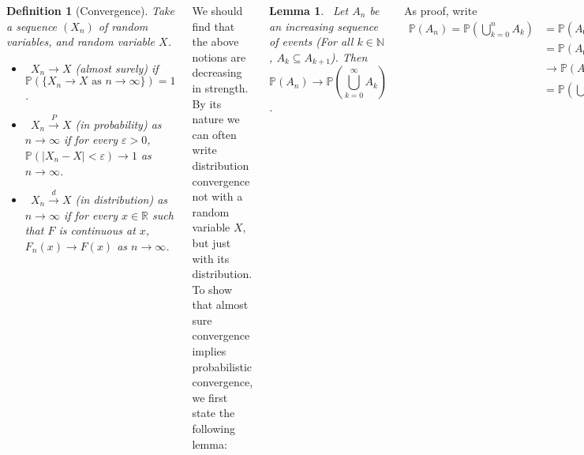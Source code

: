 \documentclass{tikzposter} %
\newtheorem{lemma}[theorem]{Lemma}
\newtheorem{definition}{Definition}
\begin{document}
\begin{columns}
{  \begin{definition}[Convergence]
    Take a sequence $(X_{n})$ of random variables, and random variable $X$.
    \begin{itemize}
            \item \ $X_{n} \to X$ (almost surely) if $\mathbb{P}(\{X_{n} \to X \text{ as } n \to \infty\}) = 1$.
            \item \ $X_{n} \overset{P}{\to} X$ (in probability) as $n \to \infty$ if for every $\varepsilon > 0$, $\mathbb{P}(|X_{n} - X| < \varepsilon) \to 1$ as $n \to \infty$.
            \item \ $X_{n} \overset{d}{\to} X$ (in distribution) as $n \to \infty$ if for every $x \in \mathbb{R}$ such that $F$ is continuous at $x$, $F_{n}(x) \to F(x)$ as $n \to \infty$.
    \end{itemize}
  \end{definition}
  \hphantom{}

  We should find that the above notions are decreasing in strength. By its nature we can often write distribution convergence not with a random variable $X$, but just with its distribution. \\

  To show that almost sure convergence implies probabilistic convergence, we first state the following lemma:
  \begin{lemma}
  \ Let $A_{n}$ be an increasing sequence of events (For all $k \in \mathbb{N}$, $A_{k} \subseteq A_{k+1}$). Then
    \[\mathbb{P}(A_{n}) \to \mathbb{P}\left(\bigcup_{k=0}^{\infty} A_{k} \right)\].
  \end{lemma}
  As proof, write
  \begin{align*}
    \mathbb{P}(A_{n}) = \mathbb{P}\left(\bigcup_{k=0}^{n} A_{k}\right) &= \mathbb{P}\left(A_{0} \cup \bigcup_{k=1}^{n} A_{k} \setminus A_{k-1}\right) \\
                                    &= \mathbb{P}(A_{0}) + \sum_{k=1}^{n}\mathbb{P}(A_{k} \setminus A_{k-1}) \\
                                    &\to \mathbb{P}(A_{0}) + \sum_{k=1}^{\infty} \mathbb{P}(A_{k} \setminus A_{k-1}) \\
    &= \mathbb{P}\left(\bigcup_{k=0}^{\infty} A_{k}\right).
  \end{align*}

  We can then consider the event defined in almost sure convergence:

  \begin{align*}
    \{X_{n} \to X \text{ as } n \to \infty\} &= \{\forall \varepsilon > 0 \,.\, \exists N \ge 0 \,.\, \forall n \ge N\,.\, |X_{n} - X| < \varepsilon\} \\
                                    &= \bigcap_{\varepsilon > 0} \bigcup_{N=0}^{\infty} \{\forall n \ge N \,.\, |X_{n} - X| < \varepsilon\} \\
                                    &\subseteq \bigcup_{N=0}^{\infty} \{\forall n \ge N \,.\, |X_{n}-X| < \varepsilon\} \quad \quad \text{for any $\varepsilon > 0$}
  \end{align*}

}
\end{columns}
\end{document}
